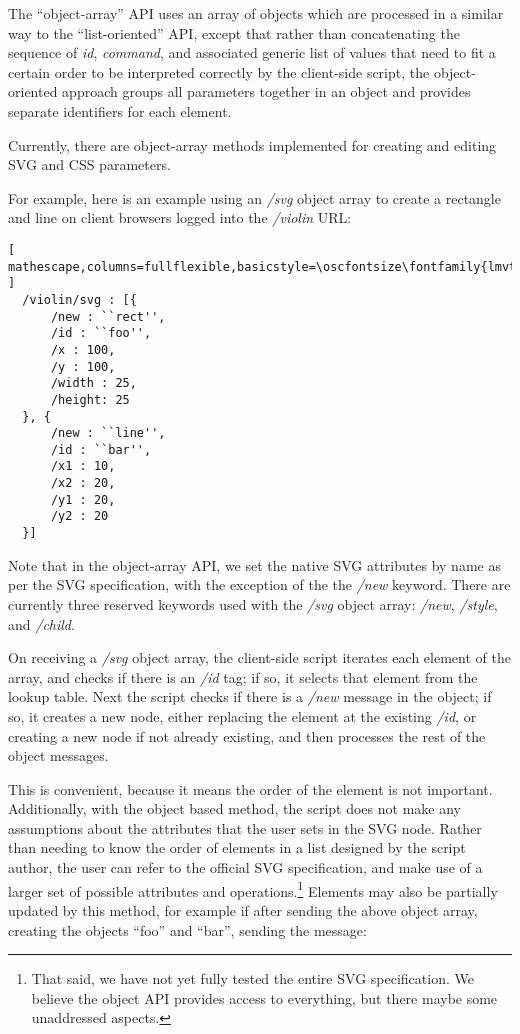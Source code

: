 The ``object-array'' API uses an array of objects which are processed in a similar way to the ``list-oriented'' API, except that rather than concatenating the sequence of \textit{id}, \textit{command}, and associated generic list of values that need to fit a certain order to be interpreted correctly by the client-side script, the object-oriented approach groups all parameters together in an object and provides separate identifiers for each element. 

Currently, there are object-array methods implemented for creating and editing SVG and CSS parameters.

For example, here is an example using an \textit{/svg} object array to create a rectangle and line on client browsers logged into the \textit{/violin} URL:

\begin{lstlisting}[ mathescape,columns=fullflexible,basicstyle=\oscfontsize\fontfamily{lmvtt}\selectfont ]
  /violin/svg : [{
      /new : ``rect'',
      /id : ``foo'',
      /x : 100,
      /y : 100,
      /width : 25,
      /height: 25
  }, {
      /new : ``line'',
      /id : ``bar'',
      /x1 : 10,
      /x2 : 20,
      /y1 : 20,
      /y2 : 20
  }]
\end{lstlisting}

\noindent
Note that in the object-array API, we set the native SVG attributes by name as per the SVG specification, with the exception of the the \textit{/new} keyword.
There are currently three reserved keywords used with the \textit{/svg} object array: \textit{/new}, \textit{/style}, and \textit{/child}.

On receiving a \textit{/svg} object array, the client-side script iterates each element of the array, and checks if there is an \textit{/id} tag; if so, it selects that element from the lookup table.
Next the script checks if there is a \textit{/new} message in the object; if so, it creates a new node, either replacing the element at the existing \textit{/id}, or creating a new node if not already existing, and then processes the rest of the object messages.

This is convenient, because it means the order of the element is not important.
Additionally, with the object based method, the script does not make any assumptions about the attributes that the user sets in the SVG node.
Rather than needing to know the order of elements in a list designed by the script author, the user can refer to the official SVG specification, and make use of a larger set of possible attributes and operations.\footnote{That said, we have not yet fully tested the entire SVG specification. We believe the object API provides access to everything, but there maybe some unaddressed aspects.} 
Elements may also be partially updated by this method, for example if after sending the above object array, creating the objects ``foo'' and ``bar'', sending the message:

